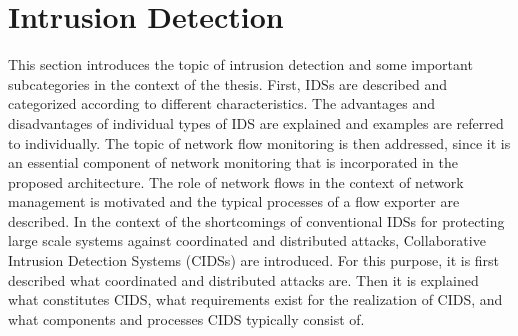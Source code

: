 \documentclass[../../../main.tex]{subfiles}
\begin{document}
\section{Intrusion Detection}

This section introduces the topic of intrusion detection and some important subcategories in the context of the thesis. First, IDSs are described and categorized according to different characteristics. The advantages and disadvantages of individual types of IDS are explained and examples are referred to individually. The topic of network flow monitoring is then addressed, since it is an essential component of network monitoring that is incorporated in the proposed architecture. The role of network flows in the context of network management is motivated and the typical processes of a flow exporter are described. In the context of the shortcomings of conventional IDSs for protecting large scale systems against coordinated and distributed attacks, Collaborative Intrusion Detection Systems (CIDSs) are introduced. For this purpose, it is first described what coordinated and distributed attacks are.  Then it is explained what constitutes CIDS, what requirements exist for the realization of CIDS, and what components and processes CIDS typically consist of.






\end{document}
